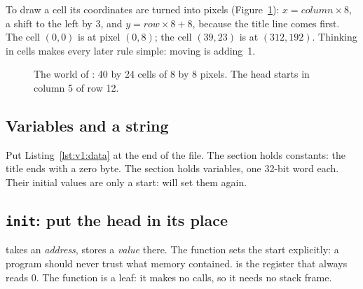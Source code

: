 To draw a cell its coordinates are turned into pixels
(Figure~\ref{fig:v1:grid}): $x = \mathit{column}\times 8$, a shift to the left
by 3, and $y = \mathit{row}\times 8+8$, because the title line comes first.
The cell $(0,0)$ is at pixel $(0,8)$; the cell $(39,23)$ is at $(312,192)$.
Thinking in cells makes every later rule simple: moving is adding~1.

\begin{figure}[htb]
\centering
{}
\caption{The world of \vermone: 40 by 24 cells of 8 by 8 pixels. The head
starts in column 5 of row 12.}
\label{fig:v1:grid}
\end{figure}

\subsection{Variables and a string}

Put Listing~\ref{lst:v1:data} at the end of the file. The section
 holds constants: the title ends with a zero byte. The section
 holds variables, one 32-bit word each. Their initial values are
only a start:  will set them again.


\subsection{\texttt{init}: put the head in its place}


 takes an \emph{address},  stores a \emph{value} there. The
function sets the start explicitly: a program should never trust what memory
contained.  is the register that always reads 0. The function is a
leaf: it makes no calls, so it needs no stack frame.

